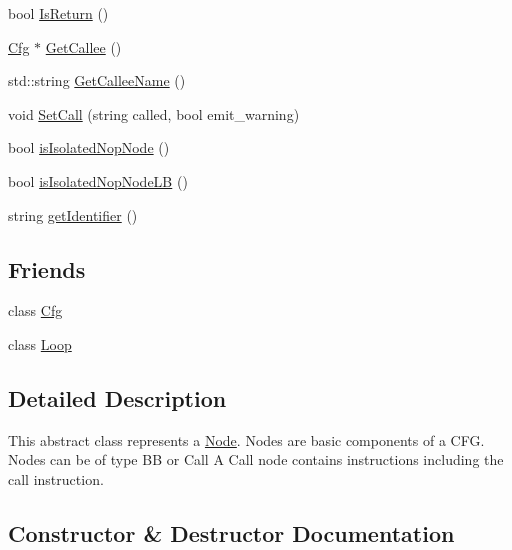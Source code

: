 \begin{DoxyCompactItemize}
\item 
bool \hyperlink{classcfglib_1_1Node_a879a88114917dcc1084aeab10bd83732}{Is\+Return} ()
\item 
\hyperlink{classcfglib_1_1Cfg}{Cfg} $\ast$ \hyperlink{classcfglib_1_1Node_af9e169489c3a49ea3e6ef95e6b24ac69}{Get\+Callee} ()
\item 
std\+::string \hyperlink{classcfglib_1_1Node_af50258a896a1960fe337ce9bfb4c038e}{Get\+Callee\+Name} ()
\item 
void \hyperlink{classcfglib_1_1Node_a1ffbf02ce392ebbed1e56f75c3bb268d}{Set\+Call} (string called, bool emit\+\_\+warning)
\item 
bool \hyperlink{classcfglib_1_1Node_a52c4537c5aac77699ab900b8b60a14eb}{is\+Isolated\+Nop\+Node} ()
\item 
bool \hyperlink{classcfglib_1_1Node_a9063f79cf7bf36717b23a71c4027142e}{is\+Isolated\+Nop\+Node\+LB} ()
\item 
string \hyperlink{classcfglib_1_1Node_a42c979a43fa0e2314076fbecd3993514}{get\+Identifier} ()
\end{DoxyCompactItemize}
\subsection*{Friends}
\begin{DoxyCompactItemize}
\item 
class \hyperlink{classcfglib_1_1Node_aad28e913031e836a51d46ca3a1a3b68b}{Cfg}
\item 
class \hyperlink{classcfglib_1_1Node_a6f7095d721dd1dbd490d97c028eb676f}{Loop}
\end{DoxyCompactItemize}


\subsection{Detailed Description}
This abstract class represents a \hyperlink{classcfglib_1_1Node}{Node}. Nodes are basic components of a C\+FG. Nodes can be of type {\ttfamily BB} or {\ttfamily Call} A {\ttfamily Call} node contains instructions including the call instruction. 

\subsection{Constructor \& Destructor Documentation}
\mbox{\label{classcfglib_1_1Node_a3ff420dfcc34125601765f1ab3444d66}} 
